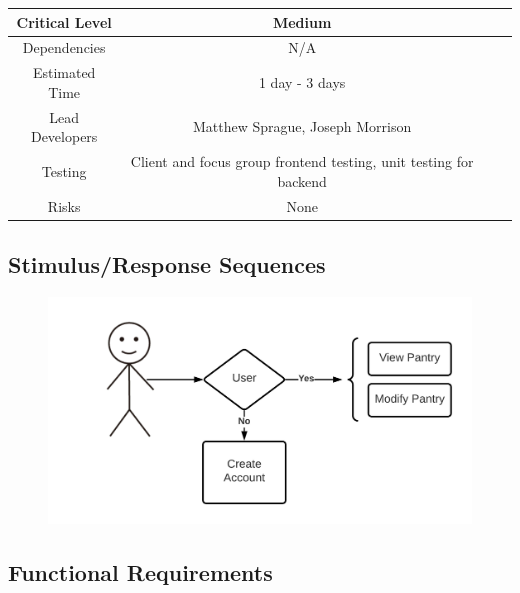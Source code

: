 \documentclass{scrreprt}
\begin{document}
\begin{center}
    \begin{tabular}{| c | c | c | c |}
        \hline
        Critical Level  & Medium                                                            \\
        \hline
        Dependencies    & N/A                                                               \\
        \hline
        Estimated Time  & 1 day - 3 days                                                    \\
        \hline
        Lead Developers & Matthew Sprague, Joseph Morrison                                  \\
        \hline
        Testing         & Client and focus group frontend testing, unit testing for backend \\
        \hline
        Risks           & None                                                              \\
        \hline
    \end{tabular}
\end{center}

\subsection{Stimulus/Response Sequences}

\begin{figure}[H]\centering
    \includegraphics[width=\columnwidth]{FlowCharts/Profile-Pantry.png}
\end{figure}

\subsection{Functional Requirements}
\end{document}
